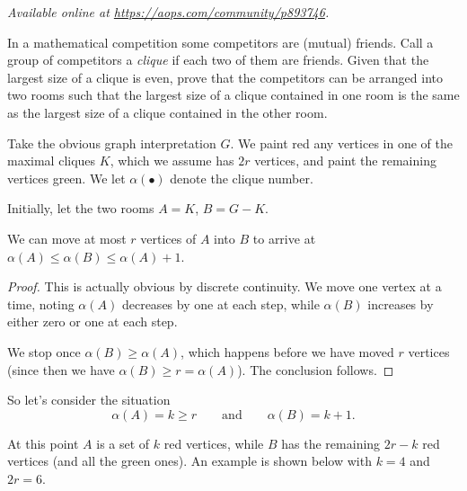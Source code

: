 \textsl{Available online at \url{https://aops.com/community/p893746}.}
\begin{mdframed}[style=mdpurplebox,frametitle={Problem statement}]
In a mathematical competition some competitors are (mutual) friends.
Call a group of competitors a \emph{clique} if each two of them are friends.
Given that the largest size of a clique is even,
prove that the competitors can be arranged into two rooms
such that the largest size of a clique contained in one room
is the same as the largest size of a clique contained in the other room.
\end{mdframed}
Take the obvious graph interpretation $G$.
We paint red any vertices in one of the maximal cliques $K$,
which we assume has $2r$ vertices,
and paint the remaining vertices green.
We let $\alpha(\bullet)$ denote the clique number.

Initially, let the two rooms $A = K$, $B = G-K$.
\begin{claim*}
  We can move at most $r$ vertices of $A$ into $B$
  to arrive at $\alpha(A) \le \alpha(B) \le \alpha(A)+1$.
\end{claim*}
\begin{proof}
  This is actually obvious by discrete continuity.
  We move one vertex at a time,
  noting $\alpha(A)$ decreases by one at each step,
  while $\alpha(B)$ increases by either zero or one at each step.

  We stop once $\alpha(B) \ge \alpha(A)$,
  which happens before we have moved $r$ vertices
  (since then we have $\alpha(B) \ge r = \alpha(A)$).
  The conclusion follows.
\end{proof}

So let's consider the situation
\[ \alpha(A) = k \ge r \qquad\text{and}\qquad \alpha(B) = k+1. \]

At this point $A$ is a set of $k$ red vertices,
while $B$ has the remaining $2r-k$ red vertices
(and all the green ones).
An example is shown below with $k=4$ and $2r = 6$.

